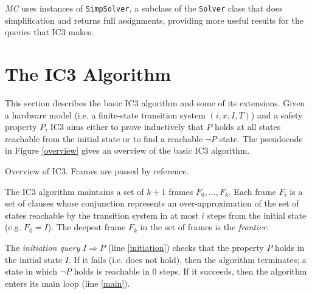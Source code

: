 \documentclass[12pt,a4paper,twoside,openright]{report}
\begin{document}
{{\emph{MC} uses instances of \verb,SimpSolver,, a subclass of the \verb,Solver, class
that does simplification and returns full assignments, providing more useful results
for the queries that IC3 makes.

\section{The IC3 Algorithm}
\label{prep:ic3}
This section describes the basic IC3 algorithm and some of its extensions.
Given a hardware model (i.e. a finite-state transition system $(i,x,I,T)$) and a
safety property $P$, IC3 aims either to prove inductively that $P$ holds
at all states reachable from the initial state or
to find a reachable $\neg P$ state.
The pseudocode in Figure \ref{overview} gives an overview of the basic IC3 algorithm.	

\begin{algorithm}[t]
\DontPrintSemicolon
{}
\caption{Overview of IC3. Frames are passed by reference.}
\label{overview}
\end{algorithm}

The IC3 algorithm maintains a set of $k + 1$ frames $F_0,\ldots,F_k$.
Each frame $F_i$ is a set of clauses whose conjunction represents an
over-approximation of the set of states reachable by the transition
system in at most $i$ steps from the initial state (e.g. $F_0 = I$).
The deepest frame $F_k$ in the set of frames is the \emph{frontier}.

The \emph{initiation query} $I \Rightarrow P$ (line \ref{initiation}) checks that
the property $P$ holds in the initial state $I$.
If it fails (i.e. does not hold), then the algorithm terminates;
a state in which $\neg P$ holds is reachable in 0 steps.
If it succeeds, then the algorithm enters its main loop (line \ref{main}).

}}
\end{document}
